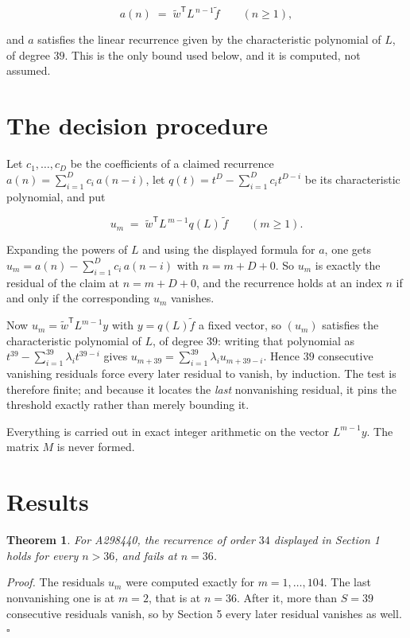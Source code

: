 \documentclass[11pt]{article}
\newtheorem{theorem}{Theorem}
\theoremstyle{definition}
\begin{document}
\[a(n) \;=\; \tilde w^{\mathsf T} L^{\,n-1} \tilde f \qquad (n \ge 1),\]

and $a$ satisfies the linear recurrence given by the characteristic polynomial of $L$, of degree $39$. This is the only bound used below, and it is computed, not assumed.

\section{The decision procedure}

Let $c_1,\dots,c_D$ be the coefficients of a claimed recurrence $a(n) = \sum_{i=1}^{D} c_i\,a(n-i)$, let $q(t) = t^{D} - \sum_{i=1}^{D} c_i t^{D-i}$ be its characteristic polynomial, and put

\[u_m \;=\; \tilde w^{\mathsf T} L^{\,m-1} q(L)\,\tilde f \qquad (m \ge 1).\]

Expanding the powers of $L$ and using the displayed formula for $a$, one gets $u_m = a(n) - \sum_{i=1}^{D} c_i\,a(n-i)$ with $n = m + D + 0$. So $u_m$ is exactly the residual of the claim at $n = m + D + 0$, and the recurrence holds at an index $n$ if and only if the corresponding $u_m$ vanishes.

Now $u_m = \tilde w^{\mathsf T} L^{m-1} y$ with $y = q(L)\tilde f$ a fixed vector, so $(u_m)$ satisfies the characteristic polynomial of $L$, of degree $39$: writing that polynomial as $t^{39} - \sum_{i=1}^{39} \lambda_i t^{39-i}$ gives $u_{m+39} = \sum_{i=1}^{39} \lambda_i u_{m+39-i}$. Hence $39$ consecutive vanishing residuals force every later residual to vanish, by induction. The test is therefore finite; and because it locates the {\itshape last} nonvanishing residual, it pins the threshold exactly rather than merely bounding it.

Everything is carried out in exact integer arithmetic on the vector $L^{m-1}y$. The matrix $M$ is never formed.

\section{Results}

\begin{theorem} For A298440, the recurrence of order $34$ displayed in Section 1 holds for every $n > 36$, and fails at $n = 36$.\end{theorem}

{\itshape Proof.} The residuals $u_m$ were computed exactly for $m = 1,\dots,104$. The last nonvanishing one is at $m = 2$, that is at $n = 36$. After it, more than $S = 39$ consecutive residuals vanish, so by Section 5 every later residual vanishes as well. $\square$
\end{document}
